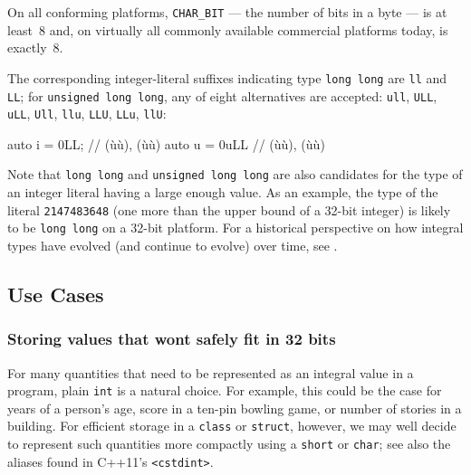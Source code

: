 \noindent On all conforming platforms, \lstinline!CHAR_BIT! --- the number of bits
in a byte --- is at least~8 and, on virtually all commonly available
commercial platforms today, is exactly~8.

The corresponding integer-literal suffixes indicating type
\lstinline!long!~\lstinline!long! are \lstinline!ll! and \lstinline!LL!; for
\lstinline!unsigned!~\lstinline!long!~\lstinline!long!, any of eight alternatives
are accepted: \lstinline!ull!, \lstinline!ULL!, \lstinline!uLL!, \lstinline!Ull!,
\lstinline!llu!, \lstinline!LLU!, \lstinline!LLu!,
\lstinline!llU!:

\begin{emcppslisting}[language=C++]
auto i = 0LL;  // (ù{}ù), (ù{}ù)
auto u = 0uLL  // (ù{}ù), (ù{}ù)
\end{emcppslisting}

\noindent Note that \lstinline!long!~\lstinline!long!
and \lstinline!unsigned!~\lstinline!long!~\lstinline!long! are also candidates
for the type of an integer literal having a large enough value. As an
example, the type of the literal \lstinline!2147483648! (one more than
the upper bound of a 32-bit integer) is likely to be
  \lstinline!long!~\lstinline!long! on a 32-bit platform. For a historical perspective on how integral types have evolved (and
continue to evolve) over time, see .

\subsection[Use Cases]{Use Cases}\label{use-cases}

\subsubsection[Storing values that won't safely fit in 32 bits]{Storing values that won{\subsubapos}t safely fit in 32 bits}\label{when-your-pedestrian-four-byte-int-might-not-cut-it}\label{Storing-values-that-won't-safely-fit-in-32-bits}

For many quantities that need to be represented as an integral value in a program, plain \lstinline!int! is a natural choice. For example, this could be the case for years of a person's age, score in a ten-pin bowling game, or number of stories in a building. For efficient storage in a \lstinline!class!
or \lstinline!struct!, however, we may well decide to represent such
quantities more compactly using a \lstinline!short! or \lstinline!char!; see
  also the aliases found in C++11's \lstinline!<cstdint>!.

